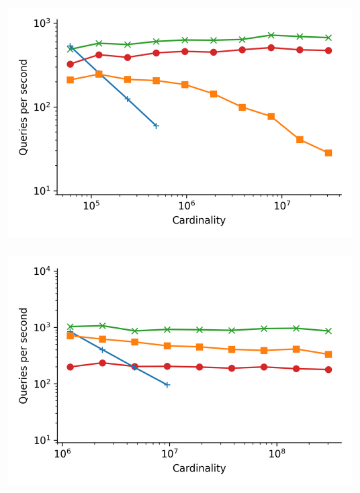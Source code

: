 \documentclass{article}
\begin{document}
\begin{figure}
    \begin{subfigure}[b]{0.47\textwidth}
        \includegraphics[width=1.0\textwidth]{plots/fashion-mnist_PermutedBall_100_throughput.png}
        \label{fig:supplement:fashion-mnist-scaling}
    \end{subfigure}%
    \begin{subfigure}[b]{0.47\textwidth}
        \includegraphics[width=1.0\textwidth]{plots/glove-25_PermutedBall_100_throughput.png}
        \label{fig:supplement:glove-25-scaling}
    \end{subfigure}%
    \\
    \begin{subfigure}[b]{0.47\textwidth}

\end{subfigure}
\end{figure}
\end{document}
